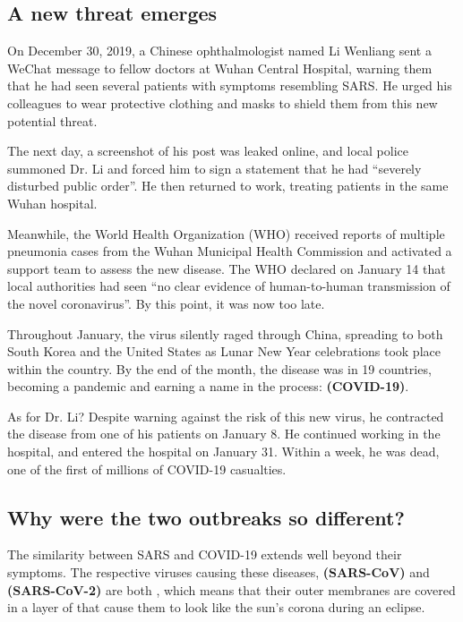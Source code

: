 \FloatBarrier
{}
\subsection{A new threat emerges}

On December 30, 2019, a Chinese ophthalmologist named Li Wenliang sent a WeChat message to fellow doctors at Wuhan Central Hospital, warning them that he had seen several patients with symptoms resembling SARS. He urged his colleagues to wear protective clothing and masks to shield them from this new potential threat.

The next day, a screenshot of his post was leaked online, and local police summoned Dr. Li and forced him to sign a statement that he had ``severely disturbed public order''. He then returned to work, treating patients in the same Wuhan hospital.

Meanwhile, the World Health Organization (WHO) received reports of multiple pneumonia cases from the Wuhan Municipal Health Commission and activated a support team to assess the new disease. The WHO declared on January 14 that local authorities had seen ``no clear evidence of human-to-human transmission of the novel coronavirus''. By this point, it was now too late.

Throughout January, the virus silently raged through China, spreading to both South Korea and the United States as Lunar New Year celebrations took place within the country. By the end of the month, the disease was in 19 countries, becoming a pandemic and earning a name in the process:  \textbf{(COVID-19)}.

As for Dr. Li? Despite warning against the risk of this new virus, he contracted the disease from one of his patients on January 8. He continued working in the hospital, and entered the hospital on January 31. Within a week, he was dead, one of the first of millions of COVID-19 casualties.

\FloatBarrier
{}
\subsection{Why were the two outbreaks so different?}

The similarity between SARS and COVID-19 extends well beyond their symptoms. The respective viruses causing these diseases,  \textbf{(SARS-CoV)} and  \textbf{(SARS-CoV-2)} are both , which means that their outer membranes are covered in a layer of  that cause them to look like the sun's corona during an eclipse.

